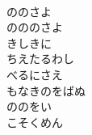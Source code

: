 \documentclass[10pt,b5j]{tarticle} %
\begin{document}
\begin{enumerate}
\begin{minipage}[c]{\blocksize}
        \vspace{\linespace}
        \item~\\
        ののさよ\\
        のののさよ\\
        きしきに\\
        ちえたるわし\\
        べるにさえ\\
        もなきのをばぬ\\
        ののをい\\
        こそくめん
    
    \end{minipage}
\end{enumerate} %
\end{document}
